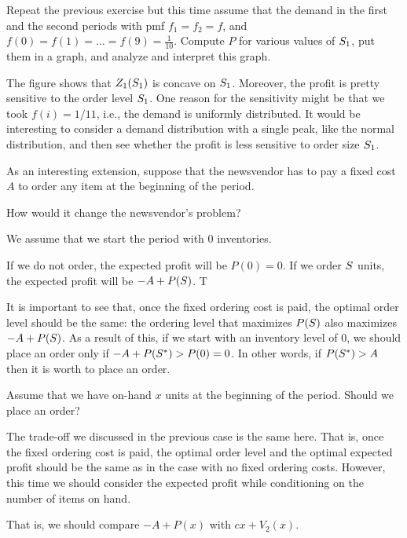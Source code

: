 \begin{exercise}
Repeat the previous exercise but this time assume that the demand in the first and the second periods with pmf $f_1 = f_2 = f$, and $f(0)=f(1)=\ldots=f(9)=\frac{1}{10}$. 
Compute $P$ for various values of $S_1$, put them in a graph, and analyze and interpret this graph.

\begin{solution}

The figure shows that $Z_1(S_1)$ is concave on $S_1$. Moreover, the profit is pretty sensitive to the order level $S_1$. One reason for the sensitivity might be that we took $f(i)=1/11$, i.e., the demand is uniformly distributed. It would be interesting to consider a demand distribution with a single peak, like the normal distribution, and then see whether the profit is less sensitive to order size $S_1$.
\end{solution}
\end{exercise}

As an interesting extension, suppose that the newsvendor has to pay a fixed cost $A$ to order any item at the beginning of the period. 
\begin{exercise}
How would it change the newsvendor's problem?


\begin{solution}
We assume that we start the period with 0 inventories. 

If we do not order, the expected profit will be $P(0)=0$. If we order $S$ units, the expected profit will be $-A+P(S)$. T

It is important to see that, once the fixed ordering cost is paid, the optimal order level should be the same: the ordering level that maximizes $P(S)$ also  maximizes $-A+P(S)$. As a result of this, if we start with an inventory level of $0$, we should place an order only if $-A+P(S^*)>P(0)=0$. In other words, if $P(S^*)>A$ then it is worth to place an order. 
\end{solution}
\end{exercise}

\begin{exercise}
Assume that we have on-hand $x$ units at the beginning of the period. Should we place an order? 
\begin{solution}
The trade-off we discussed in the previous case is the same here. That is, once the fixed ordering cost is paid, the optimal order level and the optimal expected profit should be the same as in the case with no fixed ordering costs. However, this time we should consider the expected profit while conditioning on the number of items on hand. 

That is, we should compare $-A+P(x)$ with $cx+V_2(x)$.
\end{solution}
\end{exercise}






\clearpage

